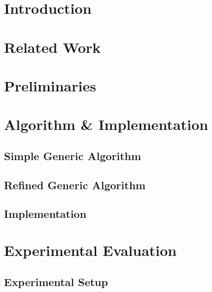 \section{Introduction}
\label{sec:introduction}

\section{Related Work}
\label{sec:related_work}

\section{Preliminaries}
\label{sec:preliminaries}

\section{Algorithm \& Implementation}
\label{sec:algorithm_implementation}

\subsection{Simple Generic Algorithm}
\label{subsec:simple_algo}

\subsection{Refined Generic Algorithm}
\label{subsec:refined_algo}

\subsection{Implementation}
\label{subsec:implementation}
%
%



\section{Experimental Evaluation}
\label{sec:evaluation}
%
%
\subsection{Experimental Setup}
\label{subsec:exp_setup}

